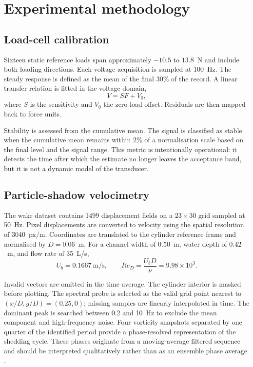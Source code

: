 \section{Experimental methodology}

\subsection{Load-cell calibration}

Sixteen static reference loads span approximately $-10.5$ to $13.8$~N and include both loading directions. Each voltage acquisition is sampled at 100~Hz. The steady response is defined as the mean of the final $30\%$ of the record. A linear transfer relation is fitted in the voltage domain,
\begin{equation}
V=S F+V_0,
\end{equation}
where $S$ is the sensitivity and $V_0$ the zero-load offset. Residuals are then mapped back to force units.

Stability is assessed from the cumulative mean. The signal is classified as stable when the cumulative mean remains within $2\%$ of a normalisation scale based on the final level and the signal range. This metric is intentionally operational: it detects the time after which the estimate no longer leaves the acceptance band, but it is not a dynamic model of the transducer.

\subsection{Particle-shadow velocimetry}

The wake dataset contains 1499 displacement fields on a $23\times30$ grid sampled at 50~Hz. Pixel displacements are converted to velocity using the spatial resolution of 3040~px/m. Coordinates are translated to the cylinder reference frame and normalised by $D=0.06$~m. For a channel width of $0.50$~m, water depth of $0.42$~m, and flow rate of 35~L/s,
\begin{equation}
U_b=0.1667\ \mathrm{m/s}, \qquad Re_D=\frac{U_bD}{\nu}=9.98\times10^3.
\end{equation}

Invalid vectors are omitted in the time average. The cylinder interior is masked before plotting. The spectral probe is selected as the valid grid point nearest to $(x/D,y/D)=(0.25,0)$; missing samples are linearly interpolated in time. The dominant peak is searched between 0.2 and 10~Hz to exclude the mean component and high-frequency noise. Four vorticity snapshots separated by one quarter of the identified period provide a phase-resolved representation of the shedding cycle. These phases originate from a moving-average filtered sequence and should be interpreted qualitatively rather than as an ensemble phase average \cite{raffel2018}.


